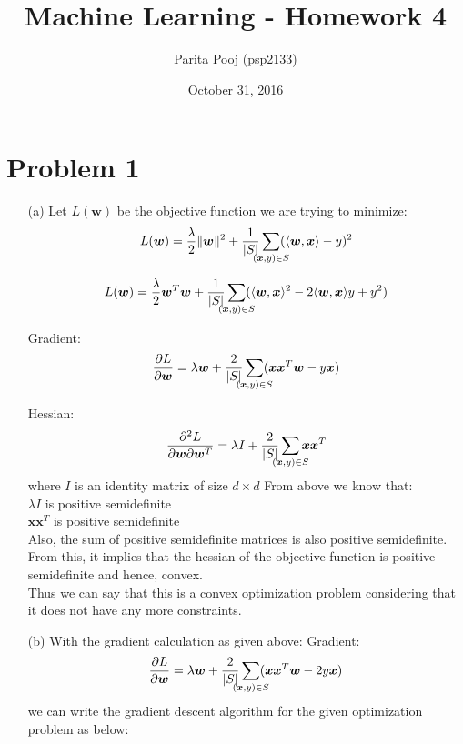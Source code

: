 \documentclass[fleqn]{article}
\title{Machine Learning - Homework 4}
\author{Parita Pooj (psp2133)}
\date{October 31, 2016}
\begin{document}
\maketitle
\setcounter{secnumdepth}{0}
\section{Problem 1}{}
\begin{itemize}
        \item[(a)]
		Let $L(\bm{w})$ be the objective function we are trying to minimize:
		\[
			L(\bm{w}) = \frac{\lambda}{2} \|\bm{w}\|^2 + \frac{1}{|S|} \smashoperator{\sum_{(\bm{x}, y) \in S}} (\langle \bm{w}, \bm{x} \rangle - y)^2
		\]

		\[
			L(\bm{w}) = \frac{\lambda}{2} \bm{w}^T\bm{w} + \frac{1}{|S|} \smashoperator{\sum_{(\bm{x}, y) \in S}} (\langle \bm{w}, \bm{x} \rangle^2 - 2\langle \bm{w}, \bm{x} \rangle y + y^2)
		\]

		Gradient:
		\[
			\frac{\partial L}{\partial \bm{w}} = \lambda \bm{w} + \frac{2}{|S|} \smashoperator{\sum_{(\bm{x}, y) \in S}} (\bm{x}\bm{x}^T\bm{w} - y\bm{x})
		\]

		Hessian:
		\[
			\frac{\partial^2 L}{\partial \bm{w} \partial \bm{w}^T} = \lambda I + \frac{2}{|S|} \smashoperator{\sum_{(\bm{x}, y) \in S}} \bm{x}\bm{x}^T
		\]
		where $I$ is an identity matrix of size $d \times d$
		From above we know that:\\
			$\lambda I$ is positive semidefinite\\
			$\bm{x}\bm{x}^T$ is positive semidefinite\\
			Also, the sum of positive semidefinite matrices is also positive semidefinite.\\
		From this, it implies that the hessian of the objective function is positive semidefinite and hence, convex.\\
		Thus we can say that this is a convex optimization problem considering that it does not have any more constraints.\\

        \item[(b)]
	With the gradient calculation as given above:
	Gradient:
		\[
			\frac{\partial L}{\partial \bm{w}} = \lambda \bm{w} + \frac{2}{|S|} \smashoperator{\sum_{(\bm{x}, y) \in S}} (\bm{x}\bm{x}^T\bm{w} - 2y\bm{x})
		\]
	we can write the gradient descent algorithm for the given optimization problem as below:\\


\end{itemize}
\end{document}
